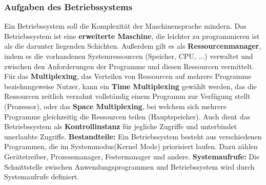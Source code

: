 \documentclass{article}
\begin{document}
\subsubsection{Aufgaben des Betriebssystems}
    Ein Betriebssystem soll die Komplexität der Maschinensprache mindern. Das Betriebssystem ist eine \textbf{erweiterte Maschine}, die leichter zu programmieren ist als die darunter liegenden Schichten. Außerdem gilt es als \textbf{Ressourcenmanager}, indem es die vorhandenen Systemressourcen (Speicher, CPU, ...) verwaltet und zwischen den Anforderungen der Programme und diesen Ressourcen vermittelt. Für das \textbf{Multiplexing}, das Verteilen von Ressourcen auf mehrere Programme beziehungsweise Nutzer, kann ein \textbf{Time Multiplexing} gewählt werden, das die Ressourcen zeitlich verzahnt vollständig einem Programm zur Verfügung stellt (Prozessor), oder das \textbf{Space Multiplexing}, bei welchem sich mehrere Programme gleichzeitig die Ressourcen teilen (Hauptspeicher). Auch dient das Betriebssystem als \textbf{Kontrollinstanz} für jegliche Zugriffe und unterbindet unerlaubte Zugriffe.\newline
    \textbf{Bestandteile:}\newline
    Ein Betriebssystem besteht aus verschiedenen Programmen, die im Systemmodus(Kernel Mode) priorisiert laufen. Dazu zählen Gerätetreiber, Prozessmanager, Festermanager und andere.\newline
    \textbf{Systemaufrufe:}\newline
    Die Schnittstelle zwischen Anwendungsprogrammen und Betriebssystem wird durch Systemaufrufe definiert. 
\end{document}
